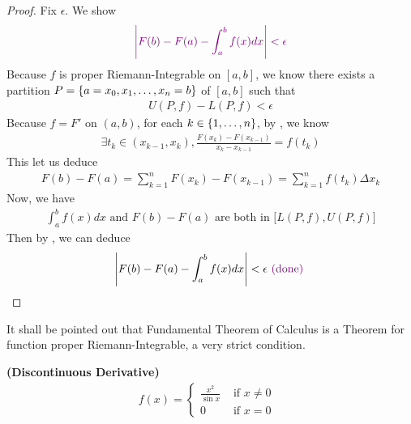 \documentclass{report}
\begin{document}
\begin{proof}
Fix $\epsilon $. We show 
\begin{align*}
\textcolor{violet}{\text{ $\left|F(b)-F(a)-\int_a^b f(x)dx\right|<\epsilon $ }}
\end{align*}
Because $f$ is proper Riemann-Integrable on $[a,b]$, we know there exists a partition $P=\{ a=x_0,x_1,\dots , x_n=b \}$ of  $[a,b]$ such that 
\begin{align}
\label{FP}
U(P,f)-L(P,f)<\epsilon 
\end{align}
Because $f=F'$ on  $(a,b)$, for each $k \in \{ 1,\dots ,n \}$, by  , we know 
\begin{align*}
\exists t_k \in (x_{k-1},x_k), \frac{F(x_k)-F(x_{k-1})}{x_k-x_{k-1}}=f(t_k)
\end{align*}
This let us deduce
\begin{align*}
F(b)-F(a)=\sum_{k=1}^n F(x_k)-F(x_{k-1})=\sum_{k=1}^n f(t_k) \Delta x_k
\end{align*}
Now, we have 
\begin{align*}
  \int_a^b f(x)dx\text{ and }F(b)-F(a)\text{ are both in }\big[ L(P,f),U(P,f) \big]
\end{align*}
Then by , we can deduce 
\begin{align*}
\left|F(b)-F(a)- \int_a^b f(x)dx\right|<\epsilon \textcolor{violet}{\text{ (done) }}
\end{align*}




\end{proof}
\begin{mdframed}
It shall be pointed out that Fundamental Theorem of Calculus is a Theorem for function proper Riemann-Integrable, a very strict condition. 
\end{mdframed}
\begin{Example}{\textbf{(Discontinuous Derivative)}}{}
\begin{align*}
f(x)=\begin{cases}
  \frac{x^2}{\sin x}& \text{ if $x\neq 0$ }\\
  0& \text{ if $x=0$ }
\end{cases}
\end{align*}
\end{Example}
\end{document}
